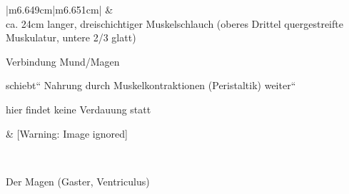 \documentclass{article}
\begin{document}
\begin{center}
\tablehead{}\begin{supertabular}{|m{6.649cm}|m{6.651cm}|}
\hline
 &
\\\hline
{\mdseries ca. 24cm langer, dreischichtiger Muskelschlauch (oberes
Drittel quergestreifte Muskulatur, untere 2/3 glatt) }

{\mdseries Verbindung Mund/Magen}

{\mdseries {\quotedblbase}schiebt{\textquotedblleft} Nahrung durch
Muskelkontraktionen (Peristaltik)
{\quotedblbase}weiter{\textquotedblleft}}

{\mdseries hier findet keine Verdauung statt}

 &
    [Warning: Image ignored] %
 \par

\\\hline
\end{supertabular}
\end{center}
{\mdseries\color[rgb]{0.0,0.0,0.5019608}
Der Magen (Gaster, Ventriculus)}
\end{document}
